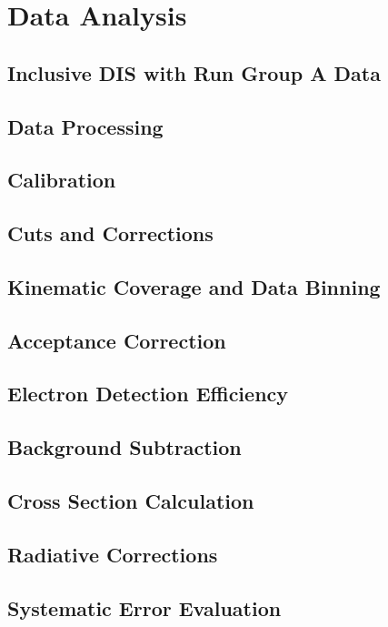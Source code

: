 \chapter{Data Analysis}
\label{ch:analysis}

\section{Inclusive DIS with Run Group A Data}

\section{Data Processing}

\section{Calibration}

\section{Cuts and Corrections}

\section{Kinematic Coverage and Data Binning}

\section{Acceptance Correction}

\section{Electron Detection Efficiency}

\section{Background Subtraction}

\section{Cross Section Calculation}

\section{Radiative Corrections}

\section{Systematic Error Evaluation}






